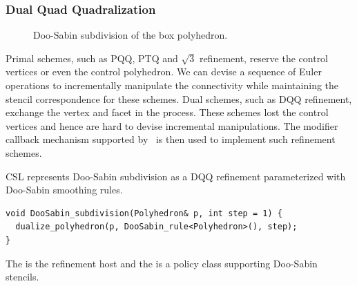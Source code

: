 \subsubsection*{Dual Quad Quadralization}

\begin{figure}[htb]
    \caption{Doo-Sabin subdivision of the box polyhedron.}
    \label{fig:ds}
\end{figure}

Primal schemes, such as PQQ, PTQ and $\sqrt{3}$ refinement, reserve
the control vertices or even the control polyhedron. 
We can devise a sequence of Euler operations to incrementally 
manipulate the connectivity while maintaining the stencil 
correspondence for these schemes.  Dual
schemes, such as DQQ refinement, exchange the vertex and facet in the
process. These schemes lost the control vertices and hence are hard to
devise incremental manipulations. The modifier callback mechanism
supported by \cgalpoly\ is then used to implement such refinement
schemes.

CSL represents Doo-Sabin subdivision as a DQQ refinement 
parameterized with Doo-Sabin smoothing rules.
\begin{lstlisting}
void DooSabin_subdivision(Polyhedron& p, int step = 1) {
  dualize_polyhedron(p, DooSabin_rule<Polyhedron>(), step);
}
\end{lstlisting}
The  is the refinement host and the
 is a policy class supporting 
Doo-Sabin stencils.
\\

